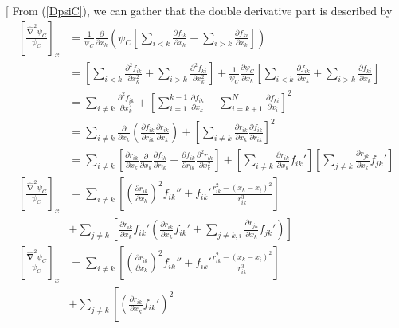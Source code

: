 \documentclass[twocolumns, a4paper,10pt,fleqn]{extarticle}
\newcommand{\eq}[1]{{\small\begin{align*}#1\end{align*}}}
\newcommand{\op}[1]{\hat{#1}}
\begin{document}
\twocolumn[{%
From (\ref{DpsiC}), we can gather that the double derivative part is described by
\eq{
  \left[\frac{\mathbf{\op\nabla}^2 \psi_C}{\psi_C}\right]_x
  &=\frac{1}{\psi_C}\frac{\partial}{\partial x_k}\left(\psi_C
      \left[\sum_{i<k} \frac{\partial f_{ik}}{\partial x_k}
      +\sum_{i>k} \frac{\partial f_{ki}}{\partial x_k} \right]\right)\\
  &=\left[\sum_{i<k} \frac{\partial^2 f_{ik}}{\partial x_k^2}
      +\sum_{i>k} \frac{\partial^2 f_{ki}}{\partial x_k^2} \right]
      +\frac{1}{\psi_C}\frac{\partial \psi_C}{\partial x_k}
      \left[\sum_{i<k} \frac{\partial f_{ik}}{\partial x_k}
      +\sum_{i>k} \frac{\partial f_{ki}}{\partial x_k} \right]\\
  &=\sum_{i\neq k}\frac{\partial^2 f_{ik}}{\partial x_k^2} +
    \left[\sum_{i=1}^{k-1}\frac{\partial f_{ik}}{\partial x_k} -
    \sum_{i=k+1}^{N}\frac{\partial f_{ki}}{\partial x_i}
    \right]^2\\
  &=\sum_{i\neq k}
    \frac{\partial}{\partial x_k}
    \left(
    \frac{\partial f_{ik}}{\partial r_{ik}}
    \frac{\partial r_{ik}}{\partial x_k}
    \right)+
    \left[\sum_{i\neq k}\frac{\partial r_{ik}}{\partial x_k}
    \frac{\partial f_{ik}}{\partial r_{ik}}
    \right]^2\\
  &=\sum_{i\neq k}
    \left[
    \frac{\partial r_{ik}}{\partial x_k}
    \frac{\partial}{\partial x_k}
    \frac{\partial f_{ik}}{\partial r_{ik}}
    +
    \frac{\partial f_{ik}}{\partial r_{ik}}
    \frac{\partial^2 r_{ik}}{\partial x_k^2}\right]
    +
    \left[\sum_{i\neq k}\frac{\partial r_{ik}}{\partial x_k} f_{ik}'
    \right]
    \left[\sum_{j\neq k}\frac{\partial r_{jk}}{\partial x_k} f_{jk}'
    \right]\\
  \left[\frac{\mathbf{\op\nabla}^2 \psi_C}{\psi_C}\right]_x
  &=\sum_{i\neq k}
    \left[
    \left(
    \frac{\partial r_{ik}}{\partial x_k}
    \right)^2
    f_{ik}''
    +
    f_{ik}'
    \frac{r_{ik}^2 - (x_k-x_i)^2}{r_{ik}^3}\right]
    \\&+
    \sum_{j\neq k}\left[\frac{\partial r_{ik}}{\partial x_k} f_{ik}'\left(
    \frac{\partial r_{ik}}{\partial x_k} f_{ik}'+
    \sum_{j\neq k,i} \frac{\partial r_{jk}}{\partial x_k} f_{jk}'\right)
    \right]\\
  \left[\frac{\mathbf{\op\nabla}^2 \psi_C}{\psi_C}\right]_x
  &=\sum_{i\neq k}
    \left[
    \left(
    \frac{\partial r_{ik}}{\partial x_k}
    \right)^2
    f_{ik}''
    +
    f_{ik}'
    \frac{r_{ik}^2 - (x_k-x_i)^2}{r_{ik}^3}\right]
    \\&+
    \sum_{j\neq k}\left[\left(\frac{\partial r_{ik}}{\partial x_k} f_{ik}'\right)^2
}}
\end{document}
